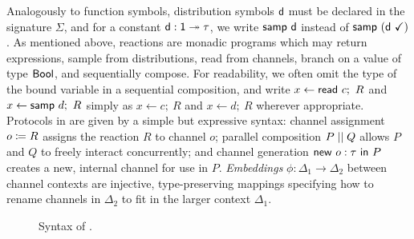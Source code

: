 Analogously to function symbols, distribution symbols $\mathsf{d}$ must be declared in the signature $\Sigma$, and for a constant $\mathsf{d} : \mathsf{1} \twoheadrightarrow \tau$, we write $\mathsf{samp} \ \mathsf{d}$ instead of $\mathsf{samp} \ (\mathsf{d} \ \checkmark)$. As mentioned above, reactions are monadic programs which may return expressions, sample from distributions, read from channels, branch on a value of type $\mathsf{Bool}$, and sequentially compose. For readability, we often omit the type of the bound variable in a sequential composition, and write $x \leftarrow \mathsf{read} \ c; \ R$ and $x \leftarrow \mathsf{samp} \ d; \ R$ simply as $x \leftarrow c; \ R$ and $x \leftarrow d; \ R$ wherever appropriate. Protocols in \ipdl are given by a simple but expressive syntax: channel assignment $o \coloneqq R$ assigns the reaction $R$ to channel $o$; parallel composition $P \; || \; Q$ allows $P$ and $Q$ to freely interact concurrently; and channel generation $\mathsf{new} \ o : \tau \ \mathsf{in} \ P$ creates a new, internal channel for use in $P$. \emph{Embeddings} $\phi : \Delta_1 \to \Delta_2$ between channel contexts are injective, type-preserving mappings specifying how to rename channels in $\Delta_2$ to fit in the larger context $\Delta_1$.

\begin{figure}[ht]
\begin{syntax}
    \alternative{\type}
		\alternative{\one}
    \alternative{\Bool}
    \alternative{\tau \times \tau}

    \alternative{\checkmark}
	  \alternative{\true}
	  \alternative{\false}		

	


	  \alternative{\zero}	

		
    \alternative{\cdot}

    \alternative{\cdot}
\end{syntax}
\caption{Syntax of \textsf{\ipdl}.}
\label{fig:syntax}
\end{figure}

